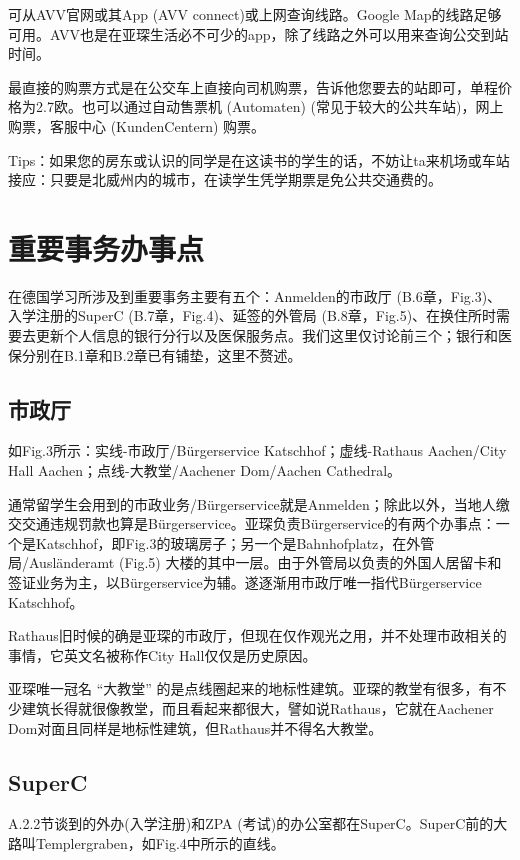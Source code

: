     可从AVV官网或其App (AVV connect)或上网查询线路。Google Map的线路足够可用。AVV也是在亚琛生活必不可少的app，除了线路之外可以用来查询公交到站时间。

    最直接的购票方式是在公交车上直接向司机购票，告诉他您要去的站即可，单程价格为2.7欧。也可以通过自动售票机 (Automaten) (常见于较大的公共车站)，网上购票，客服中心 (KundenCentern) 购票。

    Tips：如果您的房东或认识的同学是在这读书的学生的话，不妨让ta来机场或车站接应：只要是北威州内的城市，在读学生凭学期票是免公共交通费的。

\section{重要事务办事点}

  在德国学习所涉及到重要事务主要有五个：Anmelden的市政厅 (B.6章，Fig.3)、入学注册的SuperC (B.7章，Fig.4)、延签的外管局 (B.8章，Fig.5)、在换住所时需要去更新个人信息的银行分行以及医保服务点。我们这里仅讨论前三个；银行和医保分别在B.1章和B.2章已有铺垫，这里不赘述。

  \subsection{市政厅}

    如Fig.3所示：实线-市政厅/Bürgerservice Katschhof；虚线-Rathaus Aachen/City Hall Aachen；点线-大教堂/Aachener Dom/Aachen Cathedral。

    通常留学生会用到的市政业务/Bürgerservice就是Anmelden；除此以外，当地人缴交交通违规罚款也算是Bürgerservice。亚琛负责Bürgerservice的有两个办事点：一个是Katschhof，即Fig.3的玻璃房子；另一个是Bahnhofplatz，在外管局/Ausländeramt (Fig.5) 大楼的其中一层。由于外管局以负责的外国人居留卡和签证业务为主，以Bürgerservice为辅。遂逐渐用市政厅唯一指代Bürgerservice Katschhof。

    Rathaus旧时候的确是亚琛的市政厅，但现在仅作观光之用，并不处理市政相关的事情，它英文名被称作City Hall仅仅是历史原因。

    亚琛唯一冠名 “大教堂” 的是点线圈起来的地标性建筑。亚琛的教堂有很多，有不少建筑长得就很像教堂，而且看起来都很大，譬如说Rathaus，它就在Aachener Dom对面且同样是地标性建筑，但Rathaus并不得名大教堂。

  \subsection{SuperC}

    A.2.2节谈到的外办(入学注册)和ZPA (考试)的办公室都在SuperC。SuperC前的大路叫Templergraben，如Fig.4中所示的直线。

